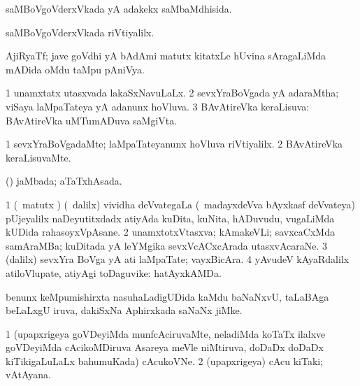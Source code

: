 \bentry
{}
\gl{\gu}
\bmng
saMBoVgoVderxVkada yA adakekx saMbaMdhisida. 
\emng
\eentry


\bentry
{}
\gl{\kirxvi}
\bmng
saMBoVgoVderxVkada riVtiyalilx. 
\emng
\eentry

\bentry
{}
\gl{\nA}
\bmng
AjiRyaTf; jave goVdhi yA bAdAmi matutx kitatxLe hUvina sAragaLiMda mADida oMdu taMpu pAniVya. 
\emng
\eentry

\bentry
{}
\gl{\gu}
\bmng
\bnum
\num{1} unamxtatx utasxvada lakaSxNavuLaLx. 
\num{2} sevxYraBoVgada yA adaraMtha; viSaya laMpaTateya yA adanunx hoVluva. 
\num{3} BAvAtireVka keraLisuva:  BAvAtireVka uMTumADuva saMgiVta. 
\enum
\emng
\eentry

\bentry
{}
\gl{\kirxvi}
\bmng
\bnum
\num{1} sevxYraBoVgadaMte; laMpaTateyanunx hoVluva riVtiyalilx. 
\num{2} BAvAtireVka keraLisuvaMte. 
\enum
\emng
\eentry

\bentry
{}
\gl{\gu}
\bmng
(\pArxparx) jaMbada; aTaTxhAsada. 
\emng
\eentry

\bentry
{}
\gl{\nA}
\bmng
\bnum
\num{1} (\girxVpu\ matutx \roVpu) (\sA\ \bava dalilx) vividha deVvategaLa (\kanmu\ madayxdeVva bAyxkasf deVvateya) pUjeyalilx naDeyutitxdadx atiyAda kuDita, kuNita, hADuvudu, \mo vugaLiMda kUDida rahasoyxVpAsane. 
\num{2} unamxtotxVtasxva; kAmakeVLi; savxcaCxMda samAraMBa; kuDitada yA leYMgika sevxVcACxcArada utasxvAcaraNe. 
\num{3} (\bava dalilx) sevxYra BoVga yA ati laMpaTate; vayxBicAra. 
\num{4} yAvudeV kAyaRdalilx atiloVlupate, atiyAgi toDaguvike:  hatAyxkAMDa. 
\enum
\emng
\eentry


\bentry
{}
\gl{\nA}
\bmng
benunx keMpumishirxta nasuhaLadigUDida kaMdu baNaNxvU, taLaBAga beLaLxgU iruva, dakiSxNa Aphirxkada saNaNx jiMke. 
\emng
\eentry

\bentry
{}
\gl{\nA}
\bmng
\bnum
\num{1} (upapxrigeya goVDeyiMda munfcAciruvaMte, neladiMda koTaTx ilalxve goVDeyiMda cAcikoMDiruva Asareya meVle niMtiruva, doDaDx doDaDx kiTikigaLuLaLx bahumuKada) cAcukoVNe.  
\hypertarget{oriel(2)}{} 
\num{2} (upapxrigeya) cAcu kiTaki; vAtAyana. 
\enum
\emng

